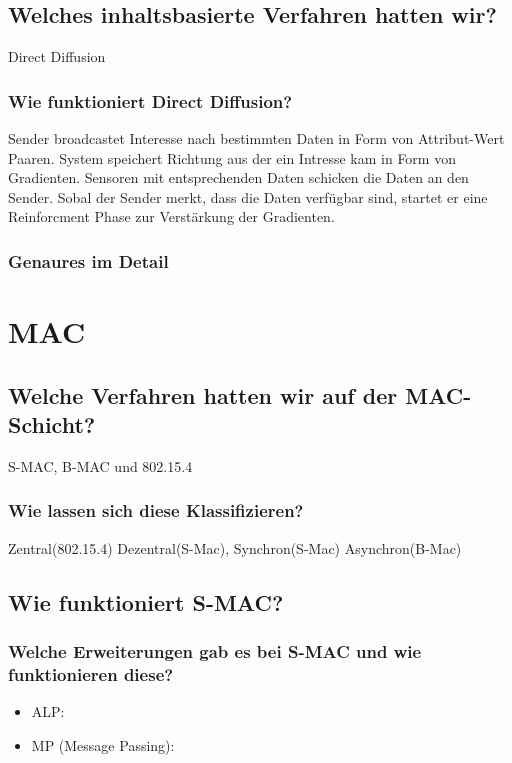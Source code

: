	\subsection{Welches inhaltsbasierte Verfahren hatten wir?}
		Direct Diffusion
	
	\subsubsection{Wie funktioniert Direct Diffusion?}		
		Sender broadcastet Interesse nach bestimmten Daten in Form von Attribut-Wert Paaren. System speichert Richtung aus der ein Intresse kam in Form von Gradienten. Sensoren mit entsprechenden Daten schicken die Daten an den Sender. Sobal der Sender merkt, dass die Daten verfügbar sind, startet er eine Reinforcment Phase zur Verstärkung der Gradienten.
		\subsubsection{Genaures im Detail } %
		

\section{MAC}
	\subsection{Welche Verfahren hatten wir auf der MAC-Schicht?}
		S-MAC, B-MAC und 802.15.4 
		
		\subsubsection{Wie lassen sich diese Klassifizieren?}
		Zentral(802.15.4) Dezentral(S-Mac), Synchron(S-Mac) Asynchron(B-Mac) %
		
	\subsection{Wie funktioniert S-MAC?}
	
	\subsubsection{Welche Erweiterungen gab es bei S-MAC und wie funktionieren diese?}
		\begin{itemize}
			\item ALP:
			\item MP (Message Passing):
		\end{itemize}
		
